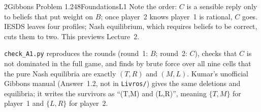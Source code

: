 \begin{exsol}{2}{Gibbons Problem 1.2}{48}{Foundations}{L1}
\interp Note the order: $C$ is a sensible reply only to beliefs that put weight on $B$; once
player~2 knows player~1 is rational, $C$ goes. IESDS leaves four profiles; Nash equilibrium,
which requires beliefs to be correct, cuts them to two. This previews Lecture~2.

\verify \texttt{check\_A1.py} reproduces the rounds (round~1: $B$; round~2: $C$), checks that $C$
is not dominated in the full game, and finds by brute force over all nine cells that the pure
Nash equilibria are exactly $(T,R)$ and $(M,L)$. Kumar's unofficial Gibbons manual (Answer~1.2,
not in \texttt{Livros/}) gives the same deletions and equilibria; it writes the survivors as
``(T,M) and (L,R)'', meaning $\{T,M\}$ for player~1 and $\{L,R\}$ for player~2.

\end{exsol}

